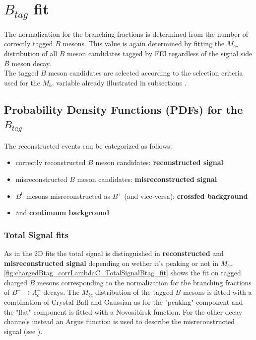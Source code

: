\chapter{$B_{tag}$ fit}

The normalization for the branching fractions is determined from the number of correctly tagged $B$ mesons. 
This value is again determined by fitting the $M_{bc}$ distribution of all $B$ meson candidates tagged
by FEI regardless of the signal side $B$ meson decay.\\
The tagged $B$ meson candidates are selected according to the selection criteria used for the $M_{bc}$ variable  
already illustrated in subsections .


\section{Probability Density Functions (PDFs) for the $B_{tag}$}

The reconstructed events can be categorized as follows:
\begin{itemize}
    \item correctly reconstructed $B$ meson candidates: \textbf{reconstructed signal} 
    \item misreconstructed $B$ meson candidates: \textbf{misreconstructed signal}
    \item $B^0$ mesons misreconstructed as $B^+$ (and vice-versa): \textbf{crossfed background} 
    \item and \textbf{continuum background}
\end{itemize}

\subsection{Total Signal fits}\label{subsec:sigBtagFit}

As in the 2D fits the total signal is distinguished in \textbf{reconstructed}  and \textbf{misreconstructed signal} depending
on wether it's peaking or not in  $M_{bc}$.\\
\cref{fig:chargedBtag_corrLambdaC_TotalSignalBtag_fit} shows the fit on tagged charged $B$ mesons corresponding to the normalization for the branching fractions of $B^- \rightarrow \Lambda_c^+$ decays.
The $M_{bc}$ distribution of the tagged  $B$ mesons is fitted with a combination of Crystal Ball and Gaussian as for the "peaking" component and the "flat" component is fitted with a Novosibirsk function. 
For the other decay channels instead an Argus function is used to describe the misreconstructed signal (see ).

